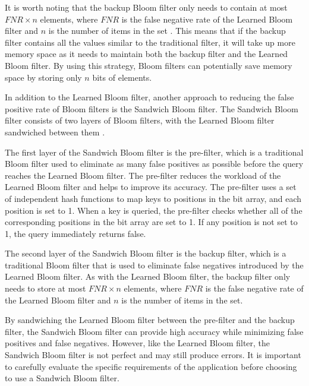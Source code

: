 It is worth noting that the backup Bloom filter only needs to contain at most $FNR \times n$ elements, where $FNR$ is the false negative rate of the Learned Bloom filter and $n$ is the number of items in the set \cite{LearnedBloom}. This means that if the backup filter contains all the values similar to the traditional filter, it will take up more memory space as it needs to maintain both the backup filter and the Learned Bloom filter. By using this strategy, Bloom filters can potentially save memory space by storing only $n$ bits of elements.

In addition to the Learned Bloom filter, another approach to reducing the false positive rate of Bloom filters is the Sandwich Bloom filter. The Sandwich Bloom filter consists of two layers of Bloom filters, with the Learned Bloom filter sandwiched between them \cite{SandWichBloomFilter}.

The first layer of the Sandwich Bloom filter is the pre-filter, which is a traditional Bloom filter used to eliminate as many false positives as possible before the query reaches the Learned Bloom filter. The pre-filter reduces the workload of the Learned Bloom filter and helps to improve its accuracy. The pre-filter uses a set of independent hash functions to map keys to positions in the bit array, and each position is set to 1. When a key is queried, the pre-filter checks whether all of the corresponding positions in the bit array are set to 1. If any position is not set to 1, the query immediately returns false.

The second layer of the Sandwich Bloom filter is the backup filter, which is a traditional Bloom filter that is used to eliminate false negatives introduced by the Learned Bloom filter. As with the Learned Bloom filter, the backup filter only needs to store at most $FNR \times n$ elements, where $FNR$ is the false negative rate of the Learned Bloom filter and $n$ is the number of items in the set.

By sandwiching the Learned Bloom filter between the pre-filter and the backup filter\cite{SandWichBloomFilter}, the Sandwich Bloom filter can provide high accuracy while minimizing false positives and false negatives. However, like the Learned Bloom filter, the Sandwich Bloom filter is not perfect and may still produce errors. It is important to carefully evaluate the specific requirements of the application before choosing to use a Sandwich Bloom filter.

